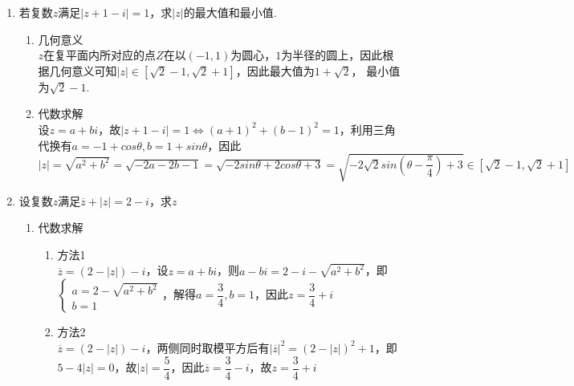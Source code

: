 \begin{enumerate}
\begin{jieda}
    \end{jieda}
    \item 若复数$z$满足$|z+1-i| = 1$，求$|z|$的最大值和最小值.
    \begin{jieda}
        \begin{enumerate}
            \item 几何意义\\
            $z$在复平面内所对应的点$Z$在以$(-1, 1)$为圆心，$1$为半径的圆上，因此根据几何意义可知$|z| \in [\sqrt{2}-1, \sqrt{2}+1]$，因此最大值为$1+\sqrt{2}$， 最小值为$\sqrt{2}-1$.
            \item 代数求解\\
            设$z = a + bi$，故$|z+1-i| = 1 \Longleftrightarrow (a+1)^2 + (b-1)^2 = 1$，利用三角代换有$a = -1 + cos\theta, b = 1 + sin \theta$，因此$|z| = \sqrt{a^2+b^2} = \sqrt{-2a-2b-1} = \sqrt{-2sin\theta+2cos\theta+3} = \sqrt{-2\sqrt{2}sin\left(\theta - \dfrac{\pi}{4}\right)+3} \in [\sqrt{2}-1, \sqrt{2}+1]$
        \end{enumerate}
    \end{jieda}
    \item 设复数$z$满足$\overline{z} + |z| = 2 - i$，求$z$
    \begin{jieda}
        \begin{enumerate}
            \item 代数求解
            \begin{enumerate}
                \item 方法1 \\
                 $\overline{z} = (2-|z|)-i$，设$z = a + bi$，则$a-bi = 2-i-\sqrt{a^2+b^2}$，即$\left \{ \begin{array}{l}
                 a = 2-\sqrt{a^2+b^2} \\
                 b = 1
                \end{array}\right. $，解得$a = \dfrac{3}{4}, b = 1$，因此$z = \dfrac{3}{4} + i$
                \item 方法2 \\
                $\overline{z} = (2-|z|)-i$，两侧同时取模平方后有$|\overline{z}|^2 = (2-|z|)^2 + 1$，即$5 - 4|z| = 0$，故$|z| = \dfrac{5}{4}$，因此$\overline{z} = \dfrac{3}{4} - i$，故$z = \dfrac{3}{4} + i$
            \end{enumerate}


\end{enumerate}
\end{jieda}
\end{enumerate}
